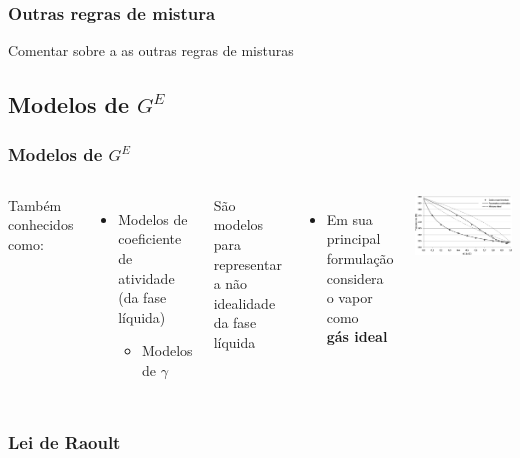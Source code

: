 \documentclass[aspectratio=169]{beamer}
\begin{document}
\begin{frame}
	\frametitle{Outras regras de mistura}
	Comentar sobre a as outras regras de misturas
\end{frame}

\subsection{Modelos de $G^E$}

\begin{frame}
	\frametitle{Modelos de $G^E$}
	\begin{columns}[c]
		Também conhecidos como:
		\begin{itemize}
			\item Modelos de coeficiente de atividade (da fase líquida)
			\begin{itemize}
				\item Modelos de $\gamma$
			\end{itemize}
		\end{itemize}
		São modelos para representar a não idealidade da fase líquida
		\begin{itemize}
			\item Em sua principal formulação considera o vapor como \\
			\textbf{gás ideal}
		\end{itemize}
		\includegraphics[width=1.0\textwidth]{img/VLE_ideal.png}
	\end{columns}
\end{frame}

\begin{frame}
	\frametitle{Lei de Raoult}
\end{frame}
\end{document}
